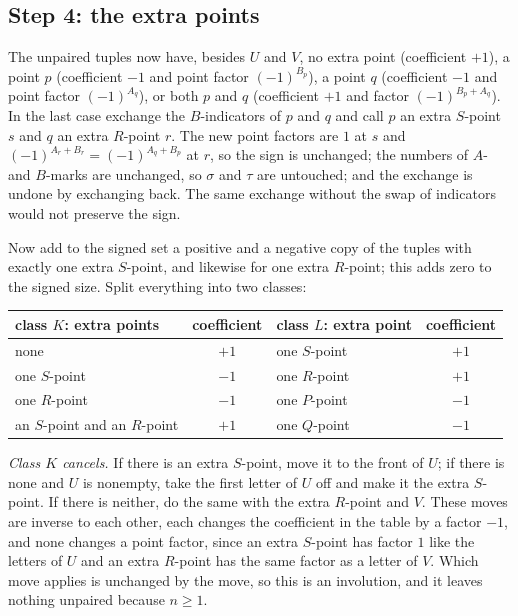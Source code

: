 \documentclass[11pt]{amsart}
\theoremstyle{remark}
\begin{document}
\subsection*{Step 4: the extra points}
The unpaired tuples now have, besides $U$ and $V$, no extra point (coefficient $+1$), a point $p$ (coefficient $-1$
and point factor $(-1)^{B_p}$), a point $q$ (coefficient $-1$ and point factor $(-1)^{A_q}$), or both $p$ and $q$
(coefficient $+1$ and factor $(-1)^{B_p+A_q}$). In the last case exchange the $B$-indicators of $p$ and $q$ and call
$p$ an extra $S$-point $s$ and $q$ an extra $R$-point $r$. The new point factors are $1$ at $s$ and
$(-1)^{A_r+B_r}=(-1)^{A_q+B_p}$ at $r$, so the sign is unchanged; the numbers of $A$- and $B$-marks are unchanged, so
$\sigma$ and $\tau$ are untouched; and the exchange is undone by exchanging back. The same exchange without the swap
of indicators would not preserve the sign.

Now add to the signed set a positive and a negative copy of the tuples with exactly one extra $S$-point, and likewise
for one extra $R$-point; this adds zero to the signed size. Split everything into two classes:

\begin{center}
\begin{tabular}{lc@{\qquad}lc}
\toprule
class $K$: extra points & coefficient & class $L$: extra point & coefficient\\
\midrule
none & $+1$ & one $S$-point & $+1$\\
one $S$-point & $-1$ & one $R$-point & $+1$\\
one $R$-point & $-1$ & one $P$-point & $-1$\\
an $S$-point and an $R$-point & $+1$ & one $Q$-point & $-1$\\
\bottomrule
\end{tabular}
\end{center}

\noindent\emph{Class $K$ cancels.} If there is an extra $S$-point, move it to the front of $U$; if there is none and
$U$ is nonempty, take the first letter of $U$ off and make it the extra $S$-point. If there is neither, do the same
with the extra $R$-point and $V$. These moves are inverse to each other, each changes the coefficient in the table
by a factor $-1$, and none changes a point factor, since an extra $S$-point has factor $1$ like the letters of $U$ and
an extra $R$-point has the same factor as a letter of $V$. Which move applies is unchanged by the move, so this is an
involution, and it leaves nothing unpaired because $n\ge1$.
\end{document}
